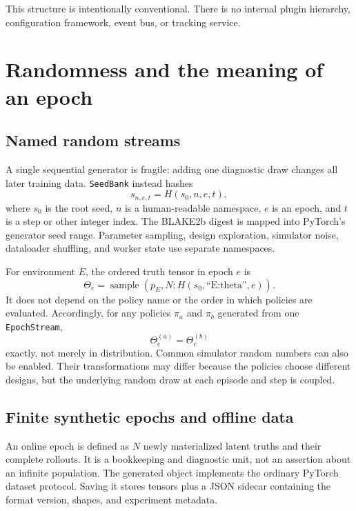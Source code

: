 \documentclass[11pt]{article}
\begin{document}
This structure is intentionally conventional. There is no internal plugin hierarchy,
configuration framework, event bus, or tracking service.

\section{Randomness and the meaning of an epoch}

\subsection{Named random streams}

A single sequential generator is fragile: adding one diagnostic draw changes all
later training data. \texttt{SeedBank} instead hashes
\begin{equation}
 s_{n,e,t} = H(s_0, n, e, t),
\end{equation}
where $s_0$ is the root seed, $n$ is a human-readable namespace, $e$ is an epoch, and
$t$ is a step or other integer index. The BLAKE2b digest is mapped into PyTorch's
generator seed range. Parameter sampling, design exploration, simulator noise,
dataloader shuffling, and worker state use separate namespaces.

For environment $E$, the ordered truth tensor in epoch $e$ is
\begin{equation}
 \Theta_e = \operatorname{sample}\left(p_E, N;
 H(s_0, \text{``E:theta''}, e)\right).
\end{equation}
It does not depend on the policy name or the order in which policies are evaluated.
Accordingly, for any policies $\pi_a$ and $\pi_b$ generated from one
\texttt{EpochStream},
\begin{equation}
 \Theta_e^{(a)} = \Theta_e^{(b)}
\end{equation}
exactly, not merely in distribution. Common simulator random numbers can also be
enabled. Their transformations may differ because the policies choose different
designs, but the underlying random draw at each episode and step is coupled.

\subsection{Finite synthetic epochs and offline data}

An online epoch is defined as $N$ newly materialized latent truths and their complete
rollouts. It is a bookkeeping and diagnostic unit, not an assertion about an infinite
population. The generated object implements the ordinary PyTorch dataset protocol.
Saving it stores tensors plus a JSON sidecar containing the format version, shapes,
and experiment metadata.
\end{document}
